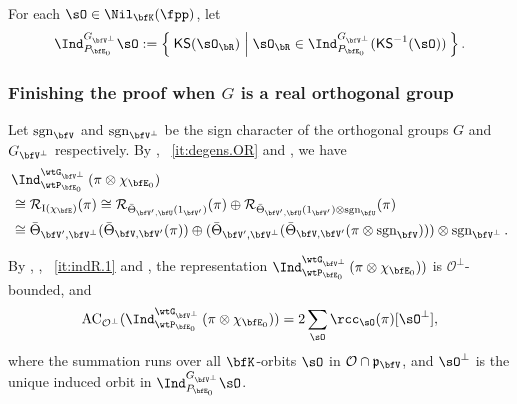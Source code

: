 \documentclass[12pt,a4paper]{amsart}
\newcommand{\AC}{\mathrm{AC}}
\def\AC{\mathrm{AC}}
\newcommand{\CO}{{\mathcal {O}}}
\newcommand{\CR}{{\mathcal {R}}}
\newcommand{\RI}{{\mathrm {I}}}
\newcommand{\sgn}{\operatorname{sgn}}
\newcommand{\p}{\mathfrak p}
\numberwithin{equation}{section}
\newtheorem{lem}[thm]{Lemma}
\theoremstyle{remark}
\def\abfV{\bfV'}
\def\KS{\mathsf{KS}}
\def\Thetab{\bar{\Theta}}
\def\KV{\bfK_{\bfV}}
\def\KV{\bfK}
\def\sOR{\sO_\bR}
\def\bfVpe{\bfV^\perp}
\begin{document}
For each $\sO\in \Nil_{\bfK}(\fpp)$, let
\[
\Ind_{P_{\bfE_0}}^{G_{\bfVpe}}\sO := \Set{\KS(\sOR)|\sOR\in \Ind_{P_{\bfE_0}}^{G_{\bfVpe}}(\KS^{-1}(\sO))}.
\]





\subsubsection{Finishing the proof when $G$ is a real orthogonal group}\label{sec:PC.ro}
Let $\sgn_{\bfV}$ and $\sgn_{\bfVpe}$ be the sign character of the orthogonal
groups $G$ and $G_{\bfVpe}$
respectively.
 By , ~\ref{it:degens.OR}
 and , we have
\begin{equation}\label{eq:decomind1}
  \begin{split}
    &\Ind_{\wtP_{\bfE_0}}^{\wtG_{\bfV^\perp}} \left(\pi\otimes
      \chi_{\bfE_0}\right) \\
    &
    \cong \CR_{\RI(\chi_{\bfE})} (\pi)
    \cong \CR_{\Thetab_{\abfV,\bfU}(1_{\abfV})}(\pi)\oplus \CR_{\Thetab_{\abfV,\bfU}(1_{\abfV}) \otimes \sgn_{\bfU}}(\pi)\\
    &\cong \Thetab_{\abfV,\bfV^\perp}(\Thetab_{\bfV,\abfV}(\pi))\oplus
    (\Thetab_{\abfV,\bfV^\perp}(\Thetab_{\bfV,\abfV}(\pi\otimes \sgn_{\bfV})))\otimes
    \sgn_{\bfV^\perp}.
  \end{split}
\end{equation}


By , , ~\ref{it:indR.1} and \cite[Theorem~1.4]{SV}, the representation
  $\Ind_{\wtP_{\bfE_0}}^{\wtG_{\bfV^\perp}} \left(\pi\otimes
    \chi_{\bfE_0}\right))$ is $\CO^\perp$-bounded, and
  \begin{equation}
    \label{chop1}
    \AC_{\CO^\perp}(\Ind_{\wtP_{\bfE_0}}^{\wtG_{\bfV^\perp}} \left(\pi\otimes
      \chi_{\bfE_0}\right))=2 \sum_{\sO} \rcc_\sO(\pi) [\sO^\perp ],
  \end{equation}
  where the summation runs over all $\KV$-orbits $\sO$ in $\CO\cap \p_{\bfV}$, and
  $\sO^\perp$ is the unique induced orbit in $\Ind_{P_{\bfE_0}}^{G_{\bfVpe}}\sO$.
\end{document}
